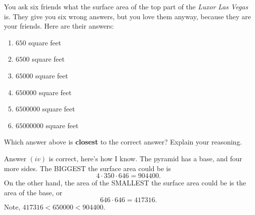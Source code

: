 \documentclass[handout,nooutcomes,noauthor,hints]{ximera}
\begin{document}
 \begin{question}%
    You ask six friends what the surface area of the top part of the
    \textit{Luxor Las Vegas} is. They give you six wrong answers, but
    you love them anyway, because they are your friends. Here are
    their answers:
    \begin{enumerate}
    \item $650$ square feet
    \item $6500$ square feet
    \item $65000$ square feet
    \item $650000$ square feet
    \item $6500000$ square feet
    \item $65000000$ square feet
    \end{enumerate}
      Which answer above is \textbf{closest} to the correct answer?
      Explain your reasoning.
      \begin{freeResponse}
        Answer $(iv)$ is correct, here's how I know. The pyramid has a
        base, and four more sides. The BIGGEST the surface area could
        be is
        \[
        4\cdot 350\cdot 646 = 904400.
        \]
        On the other hand, the area of the SMALLEST the surface area could be is
        the area of the base, or
        \[
        646\cdot 646 = 417316.
        \]
        Note, $417316 < 650000 <  904400$.        
      \end{freeResponse}
\end{question}
\end{document}
